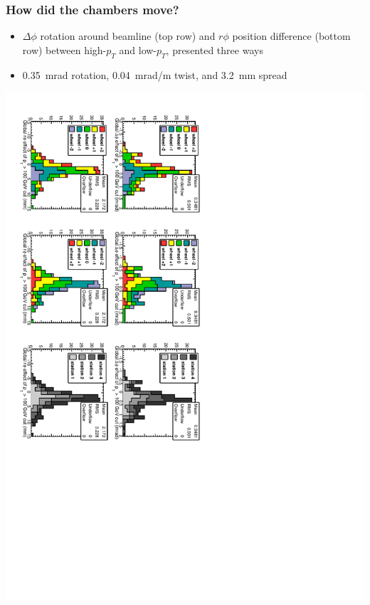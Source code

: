 \documentclass[compress]{beamer}
\begin{document}
\begin{frame}
\frametitle{How did the chambers move?}

\begin{itemize}
\item $\Delta \phi$ rotation around beamline (top row) and $r\phi$ position difference (bottom row) between high-$p_T$ and low-$p_T$, presented three ways
\item 0.35~mrad rotation, 0.04~mrad/m twist, and 3.2~mm spread
\end{itemize}

\mbox{\hspace{-0.75 cm}}\includegraphics[height=1.15\linewidth, angle=90]{data_effect_of_100GeVcut3.pdf}
\end{frame}
\end{document}
